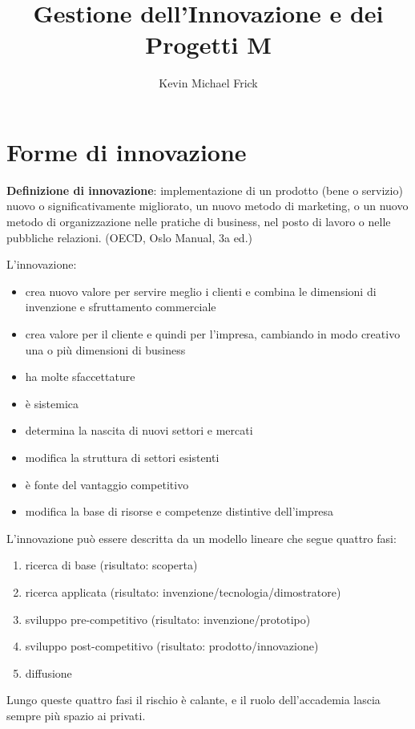 \documentclass[answers, a4paper, 11pt]{exam}
\title{Gestione dell'Innovazione e dei Progetti M}
\author{Kevin Michael Frick}
\begin{document}
\maketitle

\section{Forme di innovazione}

\textbf{Definizione di innovazione}: implementazione di un prodotto (bene o servizio) nuovo o significativamente migliorato, un nuovo metodo di marketing, o un nuovo metodo di organizzazione nelle pratiche di business, nel posto di lavoro o nelle pubbliche relazioni.
(OECD, Oslo Manual, 3a ed.)

L'innovazione:
\begin{itemize}
    \item crea nuovo valore per servire meglio i clienti e combina le dimensioni di invenzione e sfruttamento commerciale
    \item crea valore per il cliente e quindi per l'impresa, cambiando in modo creativo una o più dimensioni di business
    \item ha molte sfaccettature
    \item è sistemica
    \item determina la nascita di nuovi settori e mercati
    \item modifica la struttura di settori esistenti
    \item è fonte del vantaggio competitivo
    \item modifica la base di risorse e competenze distintive dell'impresa
\end{itemize}

L'innovazione può essere descritta da un modello lineare che segue quattro fasi:

\begin{enumerate}
    \item ricerca di base (risultato: scoperta)
    \item ricerca applicata (risultato: invenzione/tecnologia/dimostratore)
    \item sviluppo pre-competitivo (risultato: invenzione/prototipo)
    \item sviluppo post-competitivo (risultato: prodotto/innovazione)
    \item diffusione
\end{enumerate}

Lungo queste quattro fasi il rischio è calante, e il ruolo dell'accademia lascia sempre più spazio ai privati.
\end{document}
